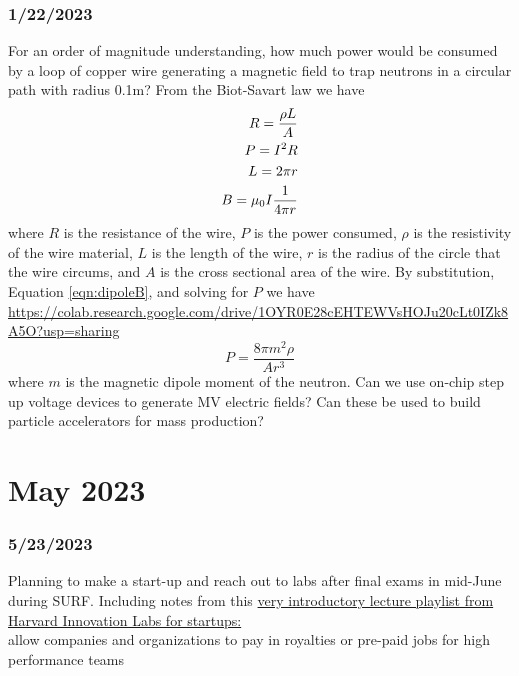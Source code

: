 \documentclass[12pt]{article}
\begin{document}
\subsubsection{1/22/2023}
For an order of magnitude understanding, how much power would be consumed by a loop of copper wire generating a magnetic field to trap neutrons in a circular path with radius 0.1m? From the Biot-Savart law we have
\begin{equation}
\begin{split}
R = \frac{\rho L}{A}\\
P = I^2R\\
L = 2\pi r\\
B = \mu\sb0I\frac{1}{4\pi r}\\
\end{split}
\end{equation}
where $R$ is the resistance of the wire, $P$ is the power consumed, $\rho$ is the resistivity of the wire material, $L$ is the length of the wire, $r$ is the radius of the circle that the wire circums, and $A$ is the cross sectional area of the wire. By substitution, Equation \ref{eqn:dipoleB}, and solving for $P$ we have \href{https://colab.research.google.com/drive/1OYR0E28cEHTEWVsHOJu20cLt0IZk8A5O?usp=sharing}{https://colab.research.google.com/drive/1OYR0E28cEHTEWVsHOJu20cLt0IZk8A5O?usp=sharing}
\begin{equation}
  P = \frac{8 \pi m^{2} \rho}{A r^{3}} 
\end{equation}
where $m$ is the magnetic dipole moment of the neutron. 
Can we use on-chip step up voltage devices to generate MV electric fields? Can these be used to build particle accelerators for mass production? 
\section{May 2023}
\subsubsection{5/23/2023}
Planning to make a start-up and reach out to labs after final exams in mid-June during SURF. Including notes from this  \href{https://www.youtube.com/watch?v=r-98YRAF1dY&list=PLxpB5Hi17Tp2cAs_OoRZSHqohHJhy9AWo&index=1}{very introductory lecture playlist from Harvard Innovation Labs for startups:}
\\

allow companies and organizations to pay in royalties or pre-paid jobs for high performance teams\\
\end{document}
